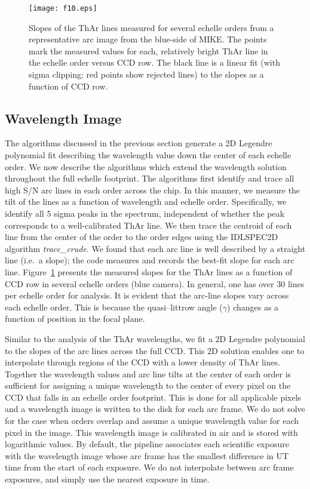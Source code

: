 \documentclass[]{emulateapj}
\begin{document}
\begin{figure}
\texttt{[image: f10.eps]}
\caption{Slopes of the ThAr lines measured for several echelle
orders from a representative arc image from the blue-side of MIKE.
The points mark the measured values for each, relatively bright ThAr 
line in the echelle order versus CCD row.  The black line
is a linear fit (with sigma clipping; red points show rejected lines)
to the slopes as a function of CCD row.
}
\label{fig:tilt}
\end{figure}

\subsection{Wavelength Image}
\label{sec:arcimg}

The algorithms discussed in the previous section 
generate a 2D Legendre polynomial fit describing the 
wavelength value down the center of each echelle order.
We now describe the algorithms which extend the wavelength
solution throughout the full echelle footprint.
The algorithms first identify and trace all high S/N arc
lines in each order across the chip.  In this manner, we measure the tilt
of the lines as a function of wavelength and echelle order.
Specifically, we identify all 5 sigma peaks in the spectrum,
independent of whether the peak corresponds to a well-calibrated 
ThAr line.  We then trace the centroid of each
line from the center of the order to the order edges
using the IDLSPEC2D algorithm {\it trace\_crude}.
We found that each arc line is well described by a straight line
(i.e.\ a slope); the code measures and records the best-fit slope
for each arc line.   
Figure~\ref{fig:tilt} presents the measured slopes 
for the ThAr lines 
as a function of CCD row 
in several echelle orders (blue camera).
In general, one has over 30 lines per echelle order for analysis.  
It is evident that the arc-line slopes vary across each echelle order.  
This is because the quasi--littrow angle ($\gamma$) changes as a function
of position in the focal plane.

Similar to the analysis of the ThAr wavelengths,
we fit a 2D Legendre polynomial
to the slopes of the arc lines across the full CCD.
This 2D solution enables one to 
interpolate through regions of the CCD with a lower density of 
ThAr lines.
Together the wavelength values and arc line tilts
at the center of each order is sufficient 
for assigning a unique wavelength to the center of every pixel
on the CCD that falls in an echelle order footprint.
This is done for all applicable pixels and
a wavelength image is written to the disk for each arc frame.
We do not solve for the case when orders overlap and assume a
unique wavelength value for each pixel in the image.
This wavelength image is calibrated in air and is stored with 
logarithmic values.
By default, the pipeline associates each scientific exposure with
the wavelength image whose arc frame has the smallest difference
in UT time from the start of each exposure.  We do not interpolate
between arc frame exposures, and simply use the nearest exposure in time.
\end{document}
